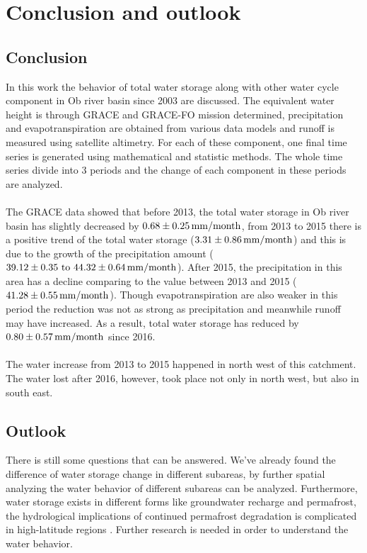 \chapter{Conclusion and outlook}
\section{Conclusion}
In this work the behavior of total water storage along with other water cycle component in Ob river basin since 2003 are discussed. The equivalent water height is through GRACE and GRACE-FO mission determined, precipitation and evapotranspiration are obtained from various data models and runoff is measured using satellite altimetry. For each of these component, one final time series is generated using mathematical and statistic methods. The whole time series divide into 3 periods and the change of each component in these periods are analyzed. \\\\
The GRACE data showed that before 2013, the total water storage in Ob river basin has slightly decreased by $0.68 \pm 0.25 \,\mathrm{mm/month}$, from 2013 to 2015 there is a positive trend of the total water storage ($3.31 \pm 0.86 \,\mathrm{mm/month}$) and this is due to the growth of the precipitation amount ($39.12 \pm 0.35\ \text{to} \ 44.32\pm 0.64 \ut{mm/month}$). After 2015, the precipitation in this area has a decline comparing to the value between 2013 and 2015 ($41.28 \pm 0.55 \,\mathrm{mm/month}$). Though evapotranspiration are also weaker in this period the reduction was not as strong as precipitation and meanwhile runoff may have increased. As a result, total water storage has reduced by $0.80 \pm 0.57 \,\mathrm{mm/month}$ since 2016. \\\\
The water increase from 2013 to 2015 happened in north west of this catchment. The water lost after 2016, however, took place not only in north west, but also in south east. 
\section{Outlook}
There is still some questions that can be answered. We've already found the difference of water storage change in different subareas, by further spatial analyzing the water behavior of different subareas can be analyzed.   Furthermore, water storage exists in different forms like groundwater recharge and permafrost, the hydrological implications of continued permafrost degradation is complicated in high-latitude regions  \cite{young2020conceptual}. Further research is needed in order to understand the water behavior. 
